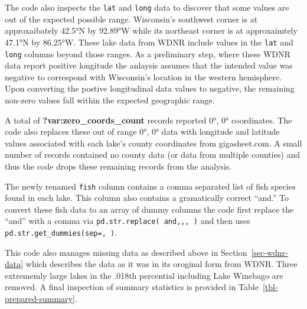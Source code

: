 \documentclass[
]{article}
\begin{document}
The code also inspects the \texttt{lat} and \texttt{long} data to
discover that some values are out of the expected possible range.
Wisconsin's southwest corner is at approxaibately 42.5°N by 92.89°W
while its northeast corner is at approxaimtely 47.1°N by 86.25°W. These
lake data from WDNR include values in the \texttt{lat} and \texttt{long}
columns beyond those ranges. As a preliminary step, where these WDNR
data report positive longitude the anlaysis assumes that the intended
value was negative to correspond with Wisconsin's location in the
western hemisphere. Upon converting the postive longitudinal data values
to negative, the remaining non-zero values fall within the expected
geographic range.

A total of \textbf{?var:zero\_coords\_count} records reported 0°, 0°
coordinates. The code also replaces these out of range 0°, 0° data with
longitude and latitude values associated with each lake's county
coordinates from gigasheet.com. A small number of records contained no
county data (or data from multiple counties) and thus the code drops
these remaining records from the analysis.

The newly renamed \texttt{fish} column contains a comma separated list
of fish species found in each lake. This column also contains a
gramatically correct ``and.'' To convert these fish data to an array of
dummy columns the code first replace the ``and'' with a comma via
\texttt{pd.str.replace(\textquotesingle{}\ and\textquotesingle{},\textquotesingle{},\textquotesingle{},\ \textquotesingle{})}
and then uses
\texttt{pd.str.get\_dummies(sep=\textquotesingle{},\ \textquotesingle{})}.

This code also manages missing data as described above in
Section~\ref{sec-wdnr-data} which describes the data as it was in its
oroginal form from WDNR. Three extrememly large lakes in the .018th
percential including Lake Winebago are removed. A final inspection of
summary statistics is provided in Table~\ref{tbl-prepared-summary}.
\end{document}
